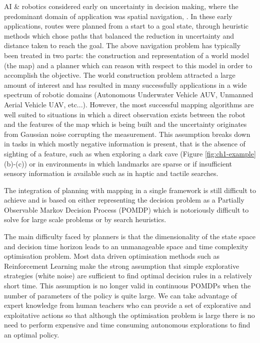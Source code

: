 AI \& robotics considered early on uncertainty in decision making, where the predominant domain of application 
was spatial navigation, \citep{acting_uncer_1996}. In these early applications, routes were planned 
from a start to a goal state, through heuristic methods which chose paths that balanced the reduction in uncertainty and 
distance taken to reach the goal. The above navigation problem has typically been treated in two parts:
the construction and representation of a world model (the map) and a planner which can reason with respect 
to this model in order to accomplish the objective. The world construction problem attracted a large amount of 
interest and has resulted in many successfully applications in a wide spectrum of robotic domains (Autonomous Underwater Vehicle AUV, Unmanned Aerial Vehicle UAV, etc...). 
However, the most successful mapping algorithms are well suited to situations in which a direct observation exists between the 
robot and the features of the map which is being built and the uncertainty originates from Gaussian noise corrupting the measurement. 
This assumption breaks down in tasks in which mostly negative information is present, that is the absence of sighting of a feature,
such as when exploring a dark cave (Figure \ref{fig:ch1-example} (b)-(c)) or in environments in which landmarks are sparse or if 
insufficient sensory information is available such as in haptic and tactile searches.

The integration of planning with mapping in a single framework is still difficult to achieve and is based on either 
representing the decision problem as a Partially Observable Markov Decision Process (POMDP) which is notoriously difficult 
to solve for large scale problems or by search heuristics.  

The main difficulty faced by planners is that the dimensionality of the state space and decision time horizon leads 
to an unmanageable space and time complexity optimisation problem. Most data driven optimisation methods such as 
Reinforcement Learning make the strong assumption that simple explorative strategies (white noise) are sufficient 
to find optimal decision rules in a relatively short time. This assumption is no longer valid in continuous POMDPs 
when the number of parameters of the policy is quite large. We can take advantage of expert knowledge from 
human teachers who can provide a set of explorative and exploitative actions so that although the optimisation 
problem is large there is no need to perform expensive and time consuming autonomous explorations to find an optimal policy. 


